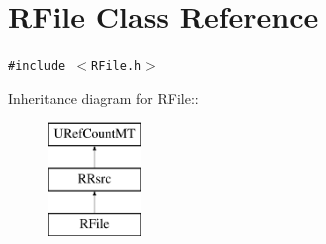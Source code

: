 \hypertarget{class_r_file}{
\section{RFile Class Reference}
\label{class_r_file}
}
{\tt \#include $<$RFile.h$>$}

Inheritance diagram for RFile::\begin{figure}[H]
\begin{center}
\leavevmode
\includegraphics[height=3cm]{class_r_file}
\end{center}
\end{figure}
